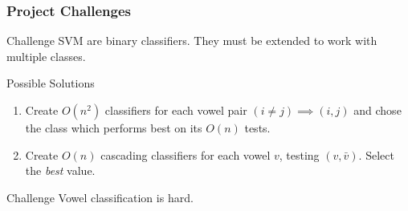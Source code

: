 \documentclass{beamer}
\begin{document}

\begin{frame}
\frametitle{Project Challenges}

\begin{block}{Challenge}
SVM are binary classifiers. They must be extended to work with multiple classes.
\end{block}

\begin{block}{Possible Solutions}
\begin{enumerate}
\item Create $O(n^2)$ classifiers for each vowel pair $(i\neq j)\implies (i,j)$ and chose the class which performs best on its $O(n)$ tests.
\item Create $O(n)$ cascading classifiers for each vowel $v$, testing $(v,\bar{v})$. Select the \textit{best} value.
\end{enumerate}

\end{block}

\begin{block}{Challenge}
Vowel classification is hard.
\end{block}

\end{frame}

\end{document}
